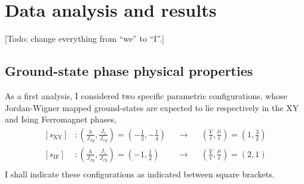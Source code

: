 \clearpage
\section{Data analysis and results}

\todo
{\color{tabred}[Todo: change everything from ``we'' to ``I''.]}

\subsection{Ground-state phase physical properties}

As a first analysis, I considered two specific parametric configurations, whose Jordan-Wigner mapped ground-states are expected to lie respectively in the $\mathrm{XY}$ and Ising Ferromagnet phases,
\[
	\begin{aligned}
		[s_\mathrm{XY}] &\colon \left(
			\frac{h}{J_{xy}}, \frac{J_{z}}{J_{xy}}
		\right) = \left(
			-\frac{1}{2}, - \frac{1}{4}
		\right) &&\to &&\left(
			\frac{V}{t}, \frac{\mu}{t}
		\right) = \left(
			1, \frac{3}{2}
		\right) \\
		[s_\mathrm{IF}] &\colon \left(
			\frac{h}{J_{xy}}, \frac{J_{z}}{J_{xy}}
		\right) = \left(
			-1, \frac{1}{2}
		\right) &&\to &&\left(
			\frac{V}{t}, \frac{\mu}{t}
		\right) = \left(
			2, 1
		\right) \\
	\end{aligned}
\]
I shall indicate these configurations as indicated between square brackets.

{\color{tabred}}

\todo